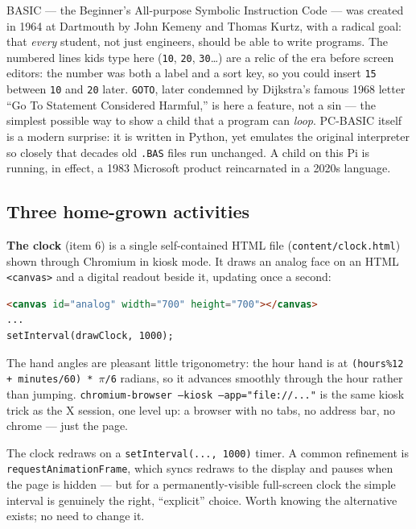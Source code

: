 \documentclass[11pt,oneside]{article}
\newcommand{\code}[1]{\texorpdfstring{\textcolor{kbblue}{\texttt{#1}}}{#1}}
\newcommand{\file}[1]{\textcolor{kbteal}{\texttt{#1}}}
\begin{document}
\begin{deeper}
BASIC --- the Beginner's All-purpose Symbolic Instruction Code --- was created in
1964 at Dartmouth by John Kemeny and Thomas Kurtz, with a radical goal: that
\emph{every} student, not just engineers, should be able to write programs. The
numbered lines kids type here (\code{10}, \code{20}, \code{30}\dots) are a relic
of the era before screen editors: the number was both a label and a sort key, so
you could insert \code{15} between \code{10} and \code{20} later. \code{GOTO},
later condemned by Dijkstra's famous 1968 letter ``Go To Statement Considered
Harmful,'' is here a feature, not a sin --- the simplest possible way to show a
child that a program can \emph{loop}. PC-BASIC itself is a modern surprise: it is
written in Python, yet emulates the original interpreter so closely that decades
old \texttt{.BAS} files run unchanged. A child on this Pi is running, in effect,
a 1983 Microsoft product reincarnated in a 2020s language.
\end{deeper}

\subsection{Three home-grown activities}

\textbf{The clock} (item 6) is a single self-contained HTML file
(\file{content/clock.html}) shown through Chromium in kiosk mode. It draws an
analog face on an HTML \code{<canvas>} and a digital readout beside it, updating
once a second:

\begin{lstlisting}[language=html]
<canvas id="analog" width="700" height="700"></canvas>
...
setInterval(drawClock, 1000);
\end{lstlisting}

The hand angles are pleasant little trigonometry: the hour hand is at
\code{(hours\%12 + minutes/60) * \(\pi\)/6} radians, so it advances smoothly
through the hour rather than jumping. \code{chromium-browser --kiosk
--app="file://..."} is the same kiosk trick as the X session, one level up: a
browser with no tabs, no address bar, no chrome --- just the page.

\begin{fieldnote}
The clock redraws on a \code{setInterval(..., 1000)} timer. A common refinement
is \code{requestAnimationFrame}, which syncs redraws to the display and pauses
when the page is hidden --- but for a permanently-visible full-screen clock the
simple interval is genuinely the right, ``explicit'' choice. Worth knowing the
alternative exists; no need to change it.
\end{fieldnote}
\end{document}
